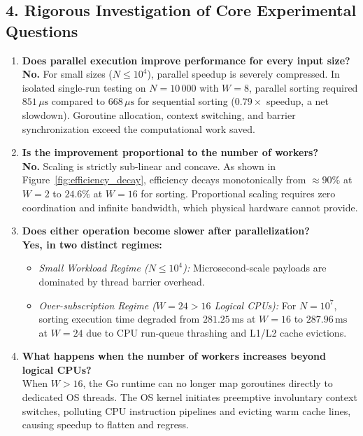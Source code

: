 \documentclass[11pt]{article}
\begin{document}
\newpage

\subsection*{4. Rigorous Investigation of Core Experimental Questions}

\begin{enumerate}[leftmargin=1.6em, itemsep=0.4em]
    \item \textbf{Does parallel execution improve performance for every input size?}\\
    \textbf{No.} For small sizes ($N \le 10^4$), parallel speedup is severely compressed. In isolated single-run testing on $N = 10\,000$ with $W = 8$, parallel sorting required $851\,\mu\text{s}$ compared to $668\,\mu\text{s}$ for sequential sorting ($0.79\times$ speedup, a net slowdown). Goroutine allocation, context switching, and barrier synchronization exceed the computational work saved.

    \item \textbf{Is the improvement proportional to the number of workers?}\\
    \textbf{No.} Scaling is strictly sub-linear and concave. As shown in Figure~\ref{fig:efficiency_decay}, efficiency decays monotonically from $\approx 90\%$ at $W = 2$ to $24.6\%$ at $W = 16$ for sorting. Proportional scaling requires zero coordination and infinite bandwidth, which physical hardware cannot provide.

    \item \textbf{Does either operation become slower after parallelization?}\\
    \textbf{Yes, in two distinct regimes:}
    \begin{itemize}
        \item \textit{Small Workload Regime ($N \le 10^4$):} Microsecond-scale payloads are dominated by thread barrier overhead.
        \item \textit{Over-subscription Regime ($W = 24 > 16$ Logical CPUs):} For $N = 10^7$, sorting execution time degraded from $281.25\,\text{ms}$ at $W=16$ to $287.96\,\text{ms}$ at $W=24$ due to CPU run-queue thrashing and L1/L2 cache evictions.
    \end{itemize}

    \item \textbf{What happens when the number of workers increases beyond logical CPUs?}\\
    When $W > 16$, the Go runtime can no longer map goroutines directly to dedicated OS threads. The OS kernel initiates preemptive involuntary context switches, polluting CPU instruction pipelines and evicting warm cache lines, causing speedup to flatten and regress.


\end{enumerate}
\end{document}
